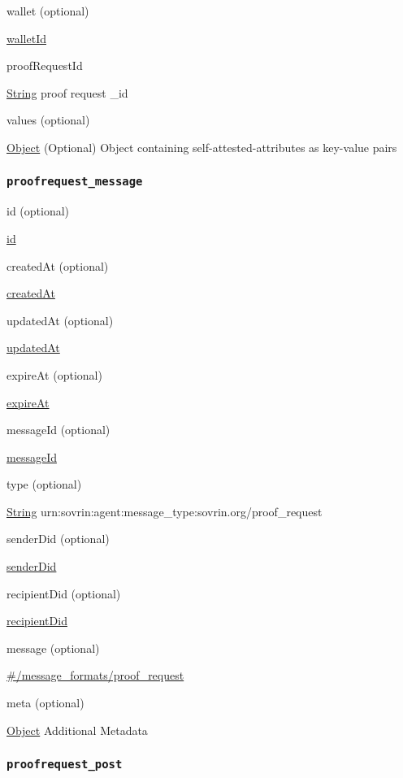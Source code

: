 wallet (optional)

{\protect\hyperlink{walletId}{walletId}}

proofRequestId

{\protect\hyperlink{string}{String}} proof request \_id

values (optional)

{\protect\hyperlink{object}{Object}} (Optional) Object containing
self-attested-attributes as key-value pairs

\hypertarget{proofrequest_message}{%
\subsubsection{\texorpdfstring{\protect\hypertarget{proofrequest_message}{}{\texttt{proofrequest\_message}}}{proofrequest\_message}}\label{proofrequest_message}}

id (optional)

{\protect\hyperlink{id}{id}}

createdAt (optional)

{\protect\hyperlink{createdAt}{createdAt}}

updatedAt (optional)

{\protect\hyperlink{updatedAt}{updatedAt}}

expireAt (optional)

{\protect\hyperlink{expireAt}{expireAt}}

messageId (optional)

{\protect\hyperlink{messageId}{messageId}}

type (optional)

{\protect\hyperlink{string}{String}}
urn:sovrin:agent:message\_type:sovrin.org/proof\_request

senderDid (optional)

{\protect\hyperlink{senderDid}{senderDid}}

recipientDid (optional)

{\protect\hyperlink{recipientDid}{recipientDid}}

message (optional)

{\protect\hyperlink{ux5cux23ux2fmessage_formatsux2fproof_request}{\#/message\_formats/proof\_request}}

meta (optional)

{\protect\hyperlink{object}{Object}} Additional Metadata

\hypertarget{proofrequest_post}{%
\subsubsection{\texorpdfstring{\protect\hypertarget{proofrequest_post}{}{\texttt{proofrequest\_post}}}{proofrequest\_post}}\label{proofrequest_post}}

